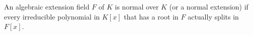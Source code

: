 An algebraic extension field $F$ of $K$ is normal over $K$ (or a normal extension) if every irreducible polynomial in $K[x]$ that has a root in $F$ actually splits in $F[x]$.
